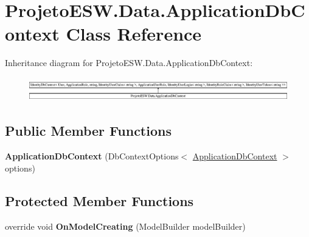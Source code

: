 \hypertarget{class_projeto_e_s_w_1_1_data_1_1_application_db_context}{}\section{Projeto\+E\+S\+W.\+Data.\+Application\+Db\+Context Class Reference}
\label{class_projeto_e_s_w_1_1_data_1_1_application_db_context}
Inheritance diagram for Projeto\+E\+S\+W.\+Data.\+Application\+Db\+Context\+:\begin{figure}[H]
\begin{center}
\leavevmode
\includegraphics[height=1.047708cm]{class_projeto_e_s_w_1_1_data_1_1_application_db_context}
\end{center}
\end{figure}
\subsection*{Public Member Functions}
\begin{DoxyCompactItemize}
\item 
\mbox{\label{class_projeto_e_s_w_1_1_data_1_1_application_db_context_a648e12f83232e226632da41ff14f4868}} 
{\bfseries Application\+Db\+Context} (Db\+Context\+Options$<$ \mbox{\hyperlink{class_projeto_e_s_w_1_1_data_1_1_application_db_context}{Application\+Db\+Context}} $>$ options)
\end{DoxyCompactItemize}
\subsection*{Protected Member Functions}
\begin{DoxyCompactItemize}
\item 
\mbox{\label{class_projeto_e_s_w_1_1_data_1_1_application_db_context_a47fe2932bfd1247fdb3abc09cf9d8e4b}} 
override void {\bfseries On\+Model\+Creating} (Model\+Builder model\+Builder)
\end{DoxyCompactItemize}
